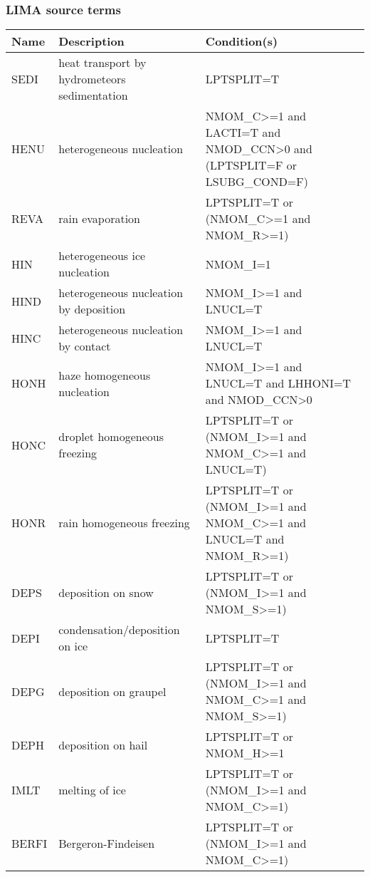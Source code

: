 \subsubsection{LIMA source terms}

\begin{longtable} {|p{}|p{}|p{}|}
\hline
Name & Description & Condition(s) \\
\hline \hline
\endhead
SEDI   & heat transport by hydrometeors sedimentation  & LPTSPLIT=T \\\hline
HENU   & heterogeneous nucleation                      & NMOM\_C>=1 and LACTI=T and NMOD\_CCN>0 and (LPTSPLIT=F or LSUBG\_COND=F) \\\hline
REVA   & rain evaporation                              & LPTSPLIT=T or (NMOM\_C>=1 and NMOM\_R>=1) \\\hline
HIN    & heterogeneous ice nucleation                  & NMOM\_I=1 \\\hline
HIND   & heterogeneous nucleation by deposition        & NMOM\_I>=1 and LNUCL=T \\\hline
HINC   & heterogeneous nucleation by contact           & NMOM\_I>=1 and LNUCL=T \\\hline
HONH   & haze homogeneous nucleation                   & NMOM\_I>=1 and LNUCL=T and LHHONI=T and NMOD\_CCN>0 \\\hline
HONC   & droplet homogeneous freezing                  & LPTSPLIT=T or (NMOM\_I>=1 and NMOM\_C>=1 and LNUCL=T) \\\hline
HONR   & rain homogeneous freezing                     & LPTSPLIT=T or (NMOM\_I>=1 and NMOM\_C>=1 and LNUCL=T and NMOM\_R>=1) \\\hline
DEPS   & deposition on snow                            & LPTSPLIT=T or (NMOM\_I>=1 and NMOM\_S>=1) \\\hline
DEPI   & condensation/deposition on ice                & LPTSPLIT=T \\\hline
DEPG   & deposition on graupel                         & LPTSPLIT=T or (NMOM\_I>=1 and NMOM\_C>=1 and NMOM\_S>=1) \\\hline
DEPH   & deposition on hail                            & LPTSPLIT=T or NMOM\_H>=1 \\\hline
IMLT   & melting of ice                                & LPTSPLIT=T or (NMOM\_I>=1 and NMOM\_C>=1) \\\hline
BERFI  & Bergeron-Findeisen                            & LPTSPLIT=T or (NMOM\_I>=1 and NMOM\_C>=1) \\\hline

\end{longtable}
